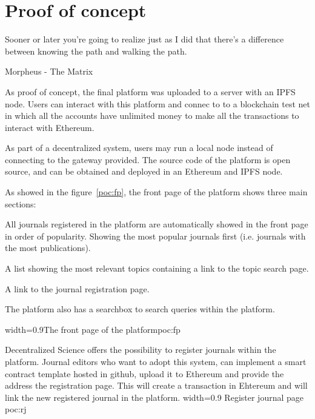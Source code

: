 \chapter{Proof of concept}
\label{poc}
\begin{FraseCelebre}
  \begin{Frase}
    Sooner or later you're going to realize just as I did that there's a
    difference between knowing the path and walking the path.
  \end{Frase}
  \begin{Fuente}
    Morpheus - The Matrix
  \end{Fuente}
\end{FraseCelebre}

As proof of concept, the final platform was uploaded to a server with an IPFS
node. Users can interact with this platform and connec to to a blockchain test
net in which all the accounts have unlimited money to make all the transactions
to interact with Ethereum.

As part of a decentralized system, users may run a local node instead of
connecting to the gateway provided. The source code of the platform is open
source, and can be obtained and deployed in an Ethereum and IPFS node.


As showed in the figure~\ref{poc:fp}, the front page of the platform shows three
main sections:

\begin{itemize}
   All journals registered in
  the platform are automatically showed in the front page in order of
  popularity. Showing the most popular journals first (i.e. journals with the
  most publications).

   A list showing the most relevant topics containing a
  link to the topic search page.

   A link to the journal registration page.

\end{itemize}

The platform also has a searchbox to search queries within the platform.

 {width=0.9\linewidth}{The front page of the
  platform}{poc:fp}


Decentralized Science offers the possibility to register journals within the
platform. Journal editors who want to adopt this system, can implement a smart
contract template hosted in github, upload it to Ethereum and provide the
address the registration page. This will create a transaction in Ehtereum and
will link the new registered journal in the platform. %
{width=0.9\linewidth}%
{Register journal page}%
{poc:rj}


